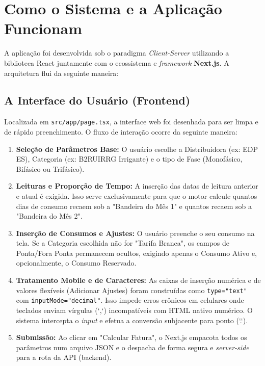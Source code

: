 \documentclass[12pt,a4paper]{article}
\begin{document}
\section{Como o Sistema e a Aplicação Funcionam}
A aplicação foi desenvolvida sob o paradigma \textit{Client-Server} utilizando a biblioteca React juntamente com o ecossistema e \textit{framework} \textbf{Next.js}. A arquitetura flui da seguinte maneira:

\subsection{A Interface do Usuário (Frontend)}
Localizada em \texttt{src/app/page.tsx}, a interface web foi desenhada para ser limpa e de rápido preenchimento. O fluxo de interação ocorre da seguinte maneira:
\begin{enumerate}
    \item \textbf{Seleção de Parâmetros Base:} O usuário escolhe a Distribuidora (ex: EDP ES), Categoria (ex: B2RUIRRG Irrigante) e o tipo de Fase (Monofásico, Bifásico ou Trifásico).
    \item \textbf{Leituras e Proporção de Tempo:} A inserção das datas de leitura anterior e atual é exigida. Isso serve exclusivamente para que o motor calcule quantos dias de consumo recaem sob a "Bandeira do Mês 1" e quantos recaem sob a "Bandeira do Mês 2".
    \item \textbf{Inserção de Consumos e Ajustes:} O usuário preenche o seu consumo na tela. Se a Categoria escolhida não for "Tarifa Branca", os campos de Ponta/Fora Ponta permanecem ocultos, exigindo apenas o Consumo Ativo e, opcionalmente, o Consumo Reservado.
    \item \textbf{Tratamento Mobile e de Caracteres:} As caixas de inserção numérica e de valores flexíveis (Adicionar Ajustes) foram construídas como \texttt{type="text"} com \texttt{inputMode="decimal"}. Isso impede erros crônicos em celulares onde teclados enviam vírgulas (`,`) incompatíveis com HTML nativo numérico. O sistema intercepta o \textit{input} e efetua a conversão subjacente para ponto (`.`).
    \item \textbf{Submissão:} Ao clicar em "Calcular Fatura", o Next.js empacota todos os parâmetros num arquivo JSON e o despacha de forma segura e \textit{server-side} para a rota da API (backend).
\end{enumerate}
\end{document}
